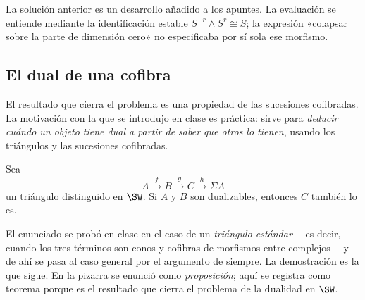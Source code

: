 \begin{nota}
   La solución anterior es un desarrollo añadido a los apuntes. La evaluación se entiende mediante la identificación estable $S^{-r}\wedge S^r\cong S$; la expresión «colapsar sobre la parte de dimensión cero» no especificaba por sí sola ese morfismo.
\end{nota}

\subsection{El dual de una cofibra}

El resultado que cierra el problema es una propiedad de las sucesiones cofibradas. La motivación con la que se introdujo en clase es práctica: sirve para \emph{deducir cuándo un objeto tiene dual a partir de saber que otros lo tienen}, usando los triángulos y las sucesiones cofibradas.

\begin{teo}\label{teo:cofibra-dual}
Sea
\[
A\xrightarrow{\ f\ }B\xrightarrow{\ g\ }C\xrightarrow{\ h\ }\Sigma A
\]
un triángulo distinguido en $\SW$. Si $A$ y $B$ son dualizables, entonces $C$ también lo es.
\end{teo}

El enunciado se probó en clase en el caso de un \emph{triángulo estándar} ---es decir, cuando los tres términos son conos y cofibras de morfismos entre complejos--- y de ahí se pasa al caso general por el argumento de siempre. La demostración es la que sigue. En la pizarra se enunció como \emph{proposición}; aquí se registra como teorema porque es el resultado que cierra el problema de la dualidad en $\SW$.

